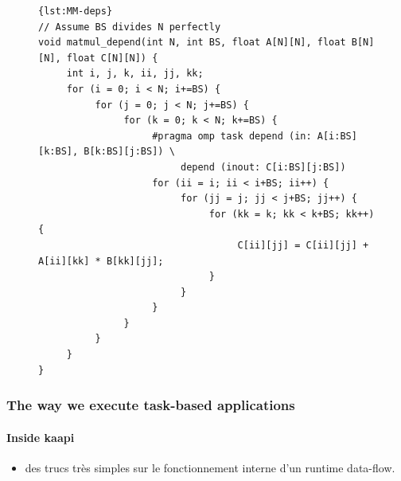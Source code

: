\documentclass{Styles/llncs}
\begin{document}

\begin{figure}[htbp]
\begin{lstlisting}[caption=Blocked matrix multiplication with OpenMP task dependencies,frame=tlrb,style=smaller,label=lst:MM-deps]{lst:MM-deps}
// Assume BS divides N perfectly
void matmul_depend(int N, int BS, float A[N][N], float B[N][N], float C[N][N]) {
     int i, j, k, ii, jj, kk;
     for (i = 0; i < N; i+=BS) {
          for (j = 0; j < N; j+=BS) {
               for (k = 0; k < N; k+=BS) {
                    #pragma omp task depend (in: A[i:BS][k:BS], B[k:BS][j:BS]) \
                         depend (inout: C[i:BS][j:BS])
                    for (ii = i; ii < i+BS; ii++) {
                         for (jj = j; jj < j+BS; jj++) {
                              for (kk = k; kk < k+BS; kk++) {
                                   C[ii][jj] = C[ii][jj] + A[ii][kk] * B[kk][jj];
                              }
                         }
                    }
               }
          }
     }
}
\end{lstlisting}
\end{figure}

\subsubsection{The way we execute task-based applications}
\paragraph{Inside kaapi}
\begin{itemize}
\item des trucs très simples sur le fonctionnement interne d'un
  runtime data-flow.
\end{itemize}
\end{document}
